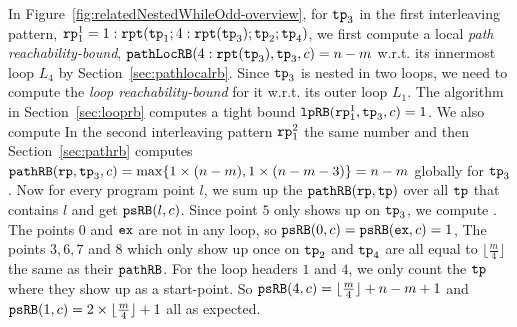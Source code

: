 In Figure~\ref{fig:relatedNestedWhileOdd-overview}, for $\mathtt{tp}_3$ in the first interleaving pattern, $\mathtt{rp}_1^1 = 1: \mathtt{rpt}(\mathtt{tp}_1; 4:\mathtt{rpt}(\mathtt{tp}_3); \mathtt{tp}_2; \mathtt{tp}_4)$, 
we first compute a local \emph{path reachability-bound}, $\mathtt{pathLocRB}(4:\mathtt{rpt}(\mathtt{tp}_3), \mathtt{tp}_3, c) = n - m$
w.r.t. its innermost loop $L_4$ by Section~\ref{sec:pathlocalrb}.
Since $\mathtt{tp}_3$ is nested in two loops, we need to compute the \emph{loop reachability-bound} for it
w.r.t. its outer loop $L_1$. The algorithm in Section~\ref{sec:looprb} computes a tight bound $\mathtt{lpRB}(\mathtt{rp}_1^1, \mathtt{tp}_3, c) = 1$. We also compute In the second interleaving pattern $\mathtt{rp}_1^2$ the same number and
then
Section~\ref{sec:pathrb} computes $\mathtt{pathRB}(\mathtt{rp}, \mathtt{tp}_3, c) = \max\{ 1 \times (n - m), 1 \times (n - m - 3) \} = n - m$ globally for $\mathtt{tp}_3$.
%
Now for every program point $l$, we sum up the $\mathtt{pathRB}(\mathtt{rp}, \mathtt{tp})$ over all $\mathtt{tp}$ that contains $l$ and get $\mathtt{psRB}(l, c)$.
Since point $5$ only shows up on $\mathtt{tp}_3$, we compute .
The points $0$ and $\mathtt{ex}$ are not in any loop, so $\mathtt{psRB}(0, c) = \mathtt{psRB}(\mathtt{ex}, c) = 1$,
The points $3, 6, 7$ and $8$ which only show up once on $\mathtt{tp}_2$ and $\mathtt{tp}_4$ are all equal to $\lfloor\frac{m}{4}\rfloor$ the same as their $\mathtt{pathRB}$.
For the loop headers $1$ and $4$, we only count the $\mathtt{tp}$ where they show up as a start-point.
So $\mathtt{psRB}(4, c) = \lfloor\frac{m}{4}\rfloor + n - m + 1$ and $\mathtt{psRB}(1,c) = 2 \times \lfloor\frac{m}{4}\rfloor + 1$ all as expected.